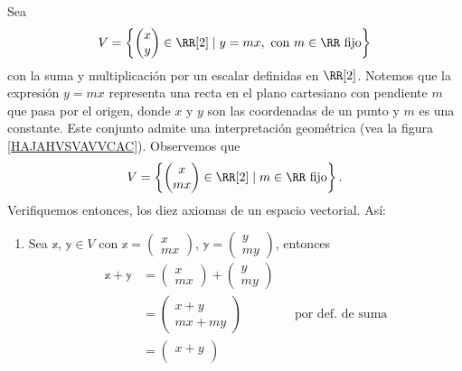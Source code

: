 \begin{examplebox}{}{}
    Sea
    $$V = \left\{ \begin{pmatrix}
        x \\
        y
    \end{pmatrix} \in \RR[2] \mid y = mx, \text{ con } m \in \RR \text{ fijo} \right\}$$
    con la suma y multiplicación por un escalar definidas en $\RR[2]$. Notemos que la expresión $y = mx$ representa una recta en el plano cartesiano con pendiente $m$ que pasa por el origen, donde $x$ y $y$ son las coordenadas de un punto y $m$ es una constante. Este conjunto admite una interpretación geométrica (vea la figura \ref{HAJAHVSVAVVCAC}). Observemos que
    $$V = \left\{ \begin{pmatrix}
        x \\
        mx
    \end{pmatrix} \in \RR[2] \mid m \in \RR \text{ fijo} \right\}.$$
    Verifiquemos entonces, los diez axiomas de un espacio vectorial. Así:
    \begin{enumerate}[label=\roman*), topsep=6pt, itemsep=0pt]
        \item Sea $\mathbb{x}$, $\mathbb{y} \in V$ con $\mathbb{x} = \begin{pmatrix}
            x \\
            mx
        \end{pmatrix}$, $\mathbb{y} = \begin{pmatrix}
            y \\
            my
        \end{pmatrix}$, entonces
        \begin{align*}
            \mathbb{x} + \mathbb{y} & = \begin{pmatrix}
                x \\
                mx
            \end{pmatrix} + \begin{pmatrix}
                y \\
                my
            \end{pmatrix} \\
            & = \begin{pmatrix}
                x + y \\
                mx + my
            \end{pmatrix} && \text{por def. de suma} \\
            & = \begin{pmatrix}
                x + y \\

\end{pmatrix}
\end{align*}
\end{enumerate}
\end{examplebox}
